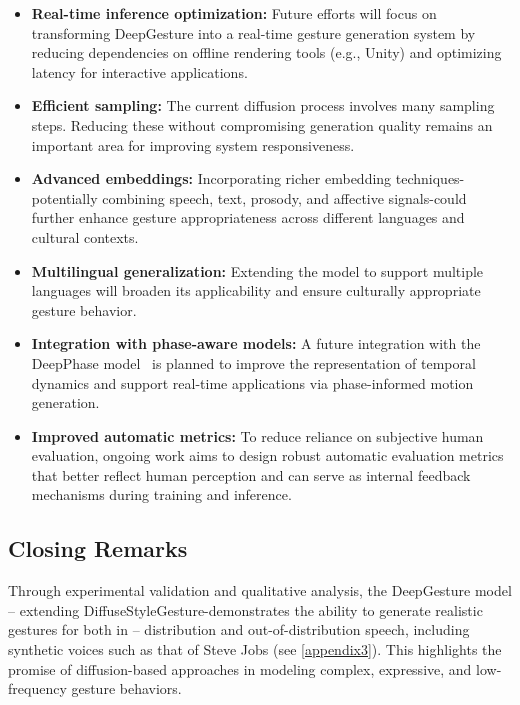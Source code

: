 \begin{itemize}
	\item \textbf{Real-time inference optimization:} Future efforts will focus on transforming DeepGesture into a real-time gesture generation system by reducing dependencies on offline rendering tools (e.g., Unity) and optimizing latency for interactive applications.
	
	\item \textbf{Efficient sampling:} The current diffusion process involves many sampling steps. Reducing these without compromising generation quality remains an important area for improving system responsiveness.
	
	\item \textbf{Advanced embeddings:} Incorporating richer embedding techniques-potentially combining speech, text, prosody, and affective signals-could further enhance gesture appropriateness across different languages and cultural contexts.
	
	\item \textbf{Multilingual generalization:} Extending the model to support multiple languages will broaden its applicability and ensure culturally appropriate gesture behavior.
	
	\item \textbf{Integration with phase-aware models:} A future integration with the DeepPhase model~\cite{starke2022deepphase} is planned to improve the representation of temporal dynamics and support real-time applications via phase-informed motion generation.
	
	\item \textbf{Improved automatic metrics:} To reduce reliance on subjective human evaluation, ongoing work aims to design robust automatic evaluation metrics that better reflect human perception and can serve as internal feedback mechanisms during training and inference.
\end{itemize}

\subsection{Closing Remarks}

Through experimental validation and qualitative analysis, the DeepGesture model -- extending DiffuseStyleGesture-demonstrates the ability to generate realistic gestures for both in -- distribution and out-of-distribution speech, including synthetic voices such as that of Steve Jobs (see \autoref{appendix3}). This highlights the promise of diffusion-based approaches in modeling complex, expressive, and low-frequency gesture behaviors.

